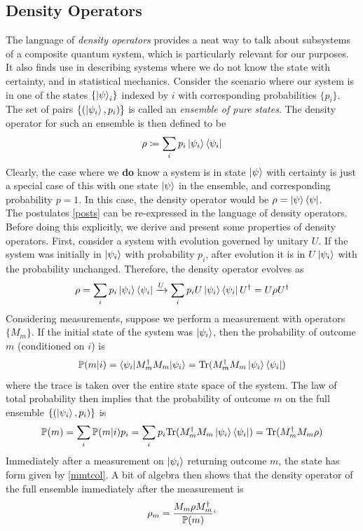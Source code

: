 \documentclass[12pt,a4paper]{report}
\newcommand{\ketbra}[2]{\ket{#1}\bra{#2}}
\newcommand{\ketbras}[1]{\ketbra{#1}{#1}}
\begin{document}
\subsection{Density Operators}
The language of \textit{density operators} provides a neat way to talk about subsystems of a composite quantum system, which is particularly relevant for our purposes. It also finds use in describing systems where we do not know the state with certainty, and in statistical mechanics. Consider the scenario where our system is in one of the states $\{\ket{\psi}_{i}\}$ indexed by $i$ with corresponding probabilities $\{p_{i}\}$. The set of pairs $\{(\ket{\psi_{i}},p_{i})\}$ is called an \textit{ensemble of pure states}. The density operator for such an ensemble is then defined to be
\begin{equation}
	\rho\coloneqq\sum_{i}p_{i}\ketbras{\psi_{i}}
\end{equation} 
Clearly, the case where we \textbf{do} know a system is in state $\ket{\psi}$ with certainty is just a special case of this with one state $\ket{\psi}$ in the ensemble, and corresponding probability $p=1$. In this case, the density operator would be $\rho=\ketbras{\psi}$.\\
The postulates \ref{posts} can be re-expressed in the language of density operators. Before doing this explicitly, we derive and present some properties of density operators. First, consider a system with evolution governed by unitary $U$. If the system was initially in $\ket{\psi_{i}}$ with probability $p_{i}$, after evolution it is in $U\ket{\psi_{i}}$ with the probability unchanged. Therefore, the density operator evolves as
\begin{equation}
	\rho=\sum_{i}p_{i}\ketbras{\psi_{i}}\xrightarrow{U}\sum_{i}p_{i}U\ketbras{\psi_{i}}U^{\dagger}=U\rho U^{\dagger}
\end{equation}
Considering measurements, suppose we perform a measurement with operators $\{M_{m}\}$. If the initial state of the system was $\ket{\psi_{i}}$, then the probability of outcome $m$ (conditioned on $i$) is
\begin{equation}
	\mathbb{P}(m|i)=\braket{\psi_{i}|M_{m}^{\dagger}M_{m}|\psi_{i}}=\text{Tr}(M_{m}^{\dagger}M_{m}\ketbras{\psi_{i}})
\end{equation}
where the trace is taken over the entire state space of the system. The law of total probability then implies that the probability of outcome $m$ on the full ensemble $\{(\ket{\psi_{i}},p_{i})\}$ is
\begin{equation}
	\mathbb{P}(m)=\sum_{i}\mathbb{P}(m|i)p_{i}=\sum_{i}p_{i}\text{Tr}(M_{m}^{\dagger}M_{m}\ketbras{\psi_{i}})=\text{Tr}(M_{m}^{\dagger}M_{m}\rho)
\end{equation}
Immediately after a measurement on $\ket{\psi_{i}}$ returning outcome $m$, the state has form given by \ref{mmtcol}. A bit of algebra then shows that the density operator of the full ensemble immediately after the measurement is
\begin{equation}
	\rho_{m}=\frac{M_{m}\rho M_{m}^{\dagger}}{\mathbb{P}(m)}`
\end{equation}
\end{document}

